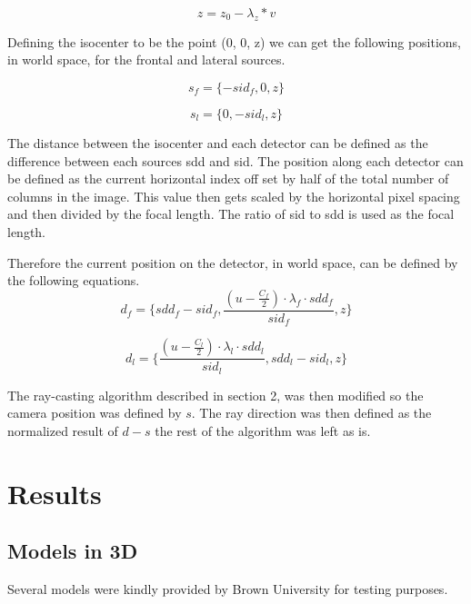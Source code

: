 \documentclass[12pt,twocolumn]{article}
\begin{document}
\begin{equation}
  z = z_0 - \lambda_z * v
\end{equation}

Defining the isocenter to be the point (0, 0, z) we can get the following positions, in world space, for the frontal 
and lateral sources.

\begin{equation}
  s_f = \{-sid_f,0,z\}
\end{equation}

\begin{equation}
  s_l = \{0,-sid_l,z\}
\end{equation}

The distance between the isocenter and each detector can be defined as the difference between each sources sdd and sid.
The position along each detector can be defined as the current horizontal index off set by half of the total number 
of columns in the image. This value then gets scaled by the horizontal pixel spacing and then divided by the focal
length. The ratio of sid to sdd is used as the focal length.

Therefore the current position on the detector, in world space, can be defined by the following equations.
\begin{equation}
  d_f = \{sdd_f-sid_f, \frac{(u - \frac{C_f}{2}) \cdot \lambda_f \cdot sdd_f}{sid_f},z\}
\end{equation}

\begin{equation}
  d_l = \{\frac{(u - \frac{C_l}{2}) \cdot \lambda_l \cdot sdd_l}{sid_l}, sdd_l-sid_l, z\}
\end{equation}

The ray-casting algorithm described in section 2, was then modified so the camera position was defined by $s$. The ray direction was then defined as the normalized result of $d-s$ the rest of the
algorithm was left as is.

\section{Results}

\subsection{Models in 3D}

Several models were kindly provided by Brown University \cite{AKHBARI2019120} for testing purposes.
\end{document}
